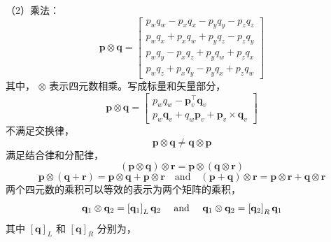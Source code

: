 （2）乘法：
\begin{equation}
\label{eqn:2.22}
\mathbf{p} \otimes \mathbf{q}=\left[ \begin{array}{c}{p_{w} q_{w}-p_{x} q_{x}-p_{y} q_{y}-p_{z} q_{z}} \\ {p_{w} q_{x}+p_{x} q_{w}+p_{y} q_{z}-p_{z} q_{y}} \\ {p_{w} q_{y}-p_{x} q_{z}+p_{y} q_{w}+p_{z} q_{x}} \\ {p_{w} q_{z}+p_{x} q_{y}-p_{y} q_{x}+p_{z} q_{w}}\end{array}\right]
\end{equation}
其中， $\otimes$ 表示四元数相乘。写成标量和矢量部分，
\begin{equation}
\label{eqn:2.23}
\mathbf{p} \otimes \mathbf{q}=\left[ \begin{array}{c}{p_{w} q_{w}-\mathbf{p}_{v}^{\top} \mathbf{q}_{v}} \\ {p_{w} \mathbf{q}_{v}+q_{w} \mathbf{p}_{v}+\mathbf{p}_{v} \times \mathbf{q}_{v}}\end{array}\right]
\end{equation}
不满足交换律，
\begin{equation}
\label{eqn:2.24}
\mathbf{p} \otimes \mathbf{q} \neq \mathbf{q} \otimes \mathbf{p}
\end{equation}
满足结合律和分配律，
\begin{equation}
\label{eqn:2.25}
(\mathbf{p} \otimes \mathbf{q}) \otimes \mathbf{r}=\mathbf{p} \otimes(\mathbf{q} \otimes \mathbf{r})
\end{equation}
\begin{equation}
\label{eqn:2.26}
\mathbf{p} \otimes(\mathbf{q}+\mathbf{r})=\mathbf{p} \otimes \mathbf{q}+\mathbf{p} \otimes \mathbf{r} \quad  
\text{and}
\quad(\mathbf{p}+\mathbf{q}) \otimes \mathbf{r}=\mathbf{p} \otimes \mathbf{r}+\mathbf{q} \otimes \mathbf{r}
\end{equation}
两个四元数的乘积可以等效的表示为两个矩阵的乘积，
\begin{equation}
\label{eqn:2.27}
\setlength{\abovedisplayskip}{6pt}
\setlength{\belowdisplayskip}{6pt}
\mathbf{q}_{1} \otimes \mathbf{q}_{2}=\left[\mathbf{q}_{1}\right]_{L} \mathbf{q}_{2} \quad \text { and } \quad \mathbf{q}_{1} \otimes \mathbf{q}_{2}=\left[\mathbf{q}_{2}\right]_{R} \mathbf{q}_{1}
\end{equation}
其中 $\left[\mathbf{q}\right]_{L}$ 和 $\left[\mathbf{q}\right]_{R}$ 分别为，
